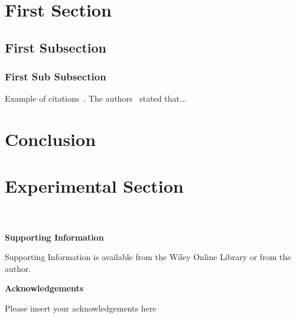 \documentclass{WileyMSP-template}
\begin{document}
\section{First Section}


\subsection{First Subsection}


\subsubsection{First Sub Subsection}


Example of citations~\cite{geiger2012we,lees2010theoretical}. The authors~\cite{urmson2008autonomous} stated that...

\section{Conclusion}


\section{Experimental Section}
\\
\\


\medskip
\textbf{Supporting Information} \par %
Supporting Information is available from the Wiley Online Library or from the author.



\medskip
\textbf{Acknowledgements} \par %
Please insert your acknowledgements here

\medskip

%


\end{document}
